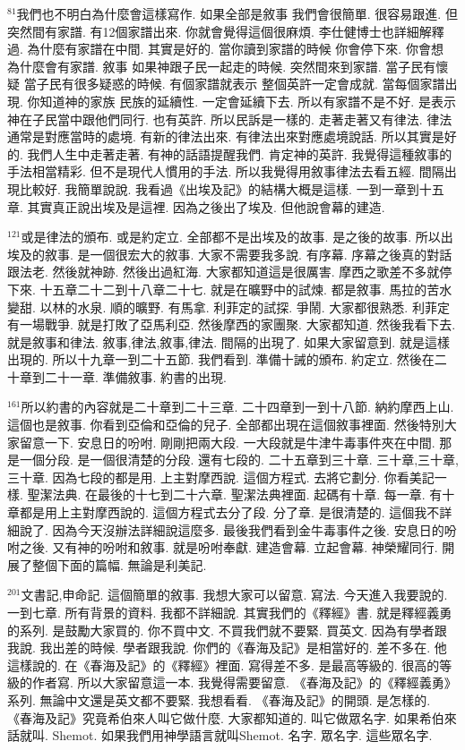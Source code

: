\documentclass{book}
\begin{document}
$^{81}$我們也不明白為什麼會這樣寫作.
如果全部是敘事 我們會很簡單.
很容易跟進.
但突然間有家譜.
有12個家譜出來.
你就會覺得這個很麻煩.
李仕健博士也詳細解釋過.
為什麼有家譜在中間.
其實是好的.
當你讀到家譜的時候 你會停下來.
你會想 為什麼會有家譜.
敘事 如果神跟子民一起走的時候.
突然間來到家譜.
當子民有懷疑 當子民有很多疑惑的時候.
有個家譜就表示 整個英許一定會成就.
當每個家譜出現.
你知道神的家族 民族的延續性.
一定會延續下去.
所以有家譜不是不好.
是表示神在子民當中跟他們同行.
也有英許.
所以民訴是一樣的.
走著走著又有律法.
律法通常是對應當時的處境.
有新的律法出來.
有律法出來對應處境說話.
所以其實是好的.
我們人生中走著走著.
有神的話語提醒我們.
肯定神的英許.
我覺得這種敘事的手法相當精彩.
但不是現代人慣用的手法.
所以我覺得用敘事律法去看五經.
間隔出現比較好.
我簡單說說.
我看過《出埃及記》的結構大概是這樣.
一到一章到十五章.
其實真正說出埃及是這裡.
因為之後出了埃及.
但他說會幕的建造.

$^{121}$或是律法的頒布.
或是約定立.
全部都不是出埃及的故事.
是之後的故事.
所以出埃及的敘事.
是一個很宏大的敘事.
大家不需要我多說.
有序幕.
序幕之後真的對話跟法老.
然後就神跡.
然後出過紅海.
大家都知道這是很厲害.
摩西之歌差不多就停下來.
十五章二十二到十八章二十七.
就是在曠野中的試煉.
都是敘事.
馬拉的苦水變甜.
以林的水泉.
順的曠野.
有馬拿.
利菲定的試探.
爭鬧.
大家都很熟悉.
利菲定有一場戰爭.
就是打敗了亞馬利亞.
然後摩西的家團聚.
大家都知道.
然後我看下去.
就是敘事和律法.
敘事,律法,敘事,律法.
間隔的出現了.
如果大家留意到.
就是這樣出現的.
所以十九章一到二十五節.
我們看到.
準備十誡的頒布.
約定立.
然後在二十章到二十一章.
準備敘事.
約書的出現.

$^{161}$所以約書的內容就是二十章到二十三章.
二十四章到一到十八節.
納約摩西上山.
這個也是敘事.
你看到亞倫和亞倫的兒子.
全部都出現在這個敘事裡面.
然後特別大家留意一下.
安息日的吩咐.
剛剛把兩大段.
一大段就是牛津牛毒事件夾在中間.
那是一個分段.
是一個很清楚的分段.
還有七段的.
二十五章到三十章.
三十章,三十章,三十章.
因為七段的都是用.
上主對摩西說.
這個方程式.
去將它劃分.
你看美記一樣.
聖潔法典.
在最後的十七到二十六章.
聖潔法典裡面.
起碼有十章.
每一章.
有十章都是用上主對摩西說的.
這個方程式去分了段.
分了章.
是很清楚的.
這個我不詳細說了.
因為今天沒辦法詳細說這麼多.
最後我們看到金牛毒事件之後.
安息日的吩咐之後.
又有神的吩咐和敘事.
就是吩咐奉獻.
建造會幕.
立起會幕.
神榮耀同行.
開展了整個下面的篇幅.
無論是利美記.

$^{201}$文書記,申命記.
這個簡單的敘事.
我想大家可以留意.
寫法.
今天進入我要說的.
一到七章.
所有背景的資料.
我都不詳細說.
其實我們的《釋經》書.
就是釋經義勇的系列.
是鼓勵大家買的.
你不買中文.
不買我們就不要緊.
買英文.
因為有學者跟我說.
我出差的時候.
學者跟我說.
你們的《春海及記》是相當好的.
差不多在.
他這樣說的.
在《春海及記》的《釋經》裡面.
寫得差不多.
是最高等級的.
很高的等級的作者寫.
所以大家留意這一本.
我覺得需要留意.
《春海及記》的《釋經義勇》系列.
無論中文還是英文都不要緊.
我想看看.
《春海及記》的開頭.
是怎樣的.
《春海及記》究竟希伯來人叫它做什麼.
大家都知道的.
叫它做眾名字.
如果希伯來話就叫.
Shemot.
如果我們用神學語言就叫Shemot.
名字.
眾名字.
這些眾名字.
\end{document}
